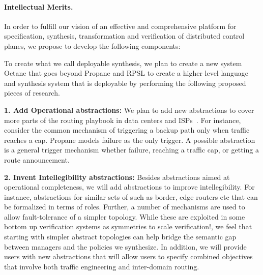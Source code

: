 
\paragraph*{Intellectual Merits.}

In order to fulfill our
vision of an effective and comprehensive platform for specification, synthesis,
transformation and verification of distributed control planes, we
propose to develop the following components:

To create what we call deployable synthesis, we plan to create a new system Octane that goes beyond Propane and RPSL to create a higher level language and synthesis system that is deployable  by performing the following proposed pieces of research.

{\bf 1.   Add Operational abstractions:}  We plan to add new abstractions to cover more parts of the routing playbook in data centers and ISPs~\cite{routingplaybook}.  For instance, consider the common mechanism of triggering a backup path only when traffic reaches a cap.   Propane models failure as the only trigger.   A possible abstraction is a general trigger mechanism whether failure, reaching a traffic cap, or getting a route announcement.

{\bf 2. Invent Intellegibility abstractions:} Besides abstractions aimed at operational completeness, we will add abstractions to improve intellegibility.  For instance, abstractions for similar sets of  such as border, edge routers etc that can be formalized in terms of roles.  Further, a number of mechanisms are used to allow fault-tolerance of a simpler topology.  While these are exploited in some bottom up verification systems as symmetries to scale verification!\cite{plotkinpopl}, we feel that starting with simpler abstract topologies can help bridge the semantic gap between managers and the policies we synthesize.  In addition, we will provide users with 
new abstractions that will allow users to specify combined objectives that
involve both traffic engineering and inter-domain routing.

